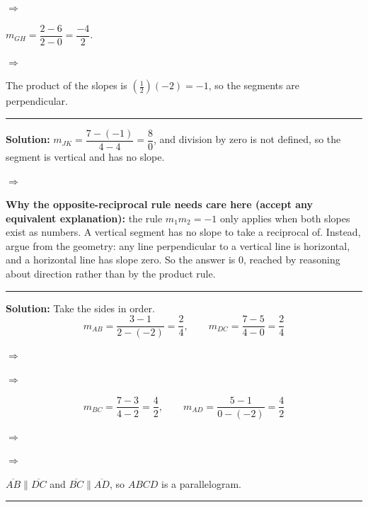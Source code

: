 \documentclass[12pt]{article}
\begin{document}
$\Rightarrow$ 

$m_{GH} = \dfrac{2 - 6}{2 - 0} = \dfrac{-4}{2}$.

$\Rightarrow$ 

The product of the slopes is $\left(\tfrac{1}{2}\right)(-2) = -1$, so the segments are perpendicular.

\vspace{0.15cm}\noindent\rule{\linewidth}{0.2pt}


\textbf{Solution:} $m_{JK} = \dfrac{7 - (-1)}{4 - 4} = \dfrac{8}{0}$, and division by zero is not defined, so the segment is vertical and has no slope.

$\Rightarrow$ 

\textbf{Why the opposite-reciprocal rule needs care here (accept any equivalent explanation):} the rule $m_1 m_2 = -1$ only applies when both slopes exist as numbers. A vertical segment has no slope to take a reciprocal of. Instead, argue from the geometry: any line perpendicular to a vertical line is horizontal, and a horizontal line has slope zero. So the answer is $0$, reached by reasoning about direction rather than by the product rule.

\vspace{0.15cm}\noindent\rule{\linewidth}{0.2pt}


\textbf{Solution:} Take the sides in order.
\[ m_{AB} = \frac{3 - 1}{2 - (-2)} = \frac{2}{4}, \qquad
   m_{DC} = \frac{7 - 5}{4 - 0} = \frac{2}{4} \]

$\Rightarrow$ 

$\Rightarrow$ 

\[ m_{BC} = \frac{7 - 3}{4 - 2} = \frac{4}{2}, \qquad
   m_{AD} = \frac{5 - 1}{0 - (-2)} = \frac{4}{2} \]

$\Rightarrow$ 

$\Rightarrow$ 

$\overline{AB} \parallel \overline{DC}$ and $\overline{BC} \parallel \overline{AD}$, so $ABCD$ is a parallelogram.

\vspace{0.15cm}\noindent\rule{\linewidth}{0.2pt}
\end{document}
